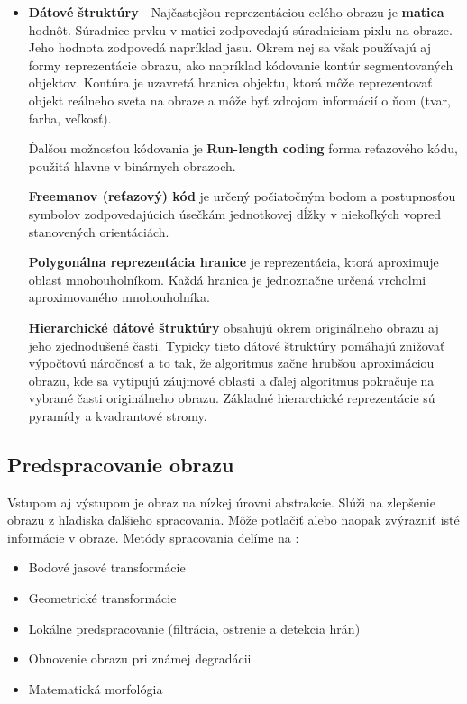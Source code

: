 \begin{itemize}
\item \textbf{Dátové štruktúry} - Najčastejšou reprezentáciou celého obrazu je \textbf{matica} hodnôt. Súradnice prvku v matici zodpovedajú súradniciam pixlu na obraze. Jeho hodnota zodpovedá napríklad jasu.  Okrem nej sa však používajú aj formy reprezentácie obrazu, ako napríklad kódovanie kontúr segmentovaných objektov. Kontúra je uzavretá hranica objektu, ktorá môže reprezentovať objekt reálneho sveta na obraze a môže byť zdrojom informácií o ňom (tvar, farba, veľkosť). \cite{Analysis_and_Machine_Vision}

Ďalšou možnosťou kódovania je \textbf{Run-length coding} forma reťazového kódu, použitá hlavne v binárnych obrazoch. 

\textbf{Freemanov (reťazový) kód} je určený počiatočným bodom a postupnosťou symbolov zodpovedajúcich úsečkám jednotkovej dĺžky v niekoľkých vopred stanovených orientáciách. \cite{Analysis_and_Machine_Vision} 

\textbf{Polygonálna reprezentácia hranice} je reprezentácia, ktorá aproximuje oblasť mnohouholníkom. Každá hranica je jednoznačne určená vrcholmi aproximovaného mnohouholníka. \cite{Analysis_and_Machine_Vision}

\textbf{Hierarchické dátové štruktúry} obsahujú okrem originálneho obrazu aj jeho zjednodušené časti. Typicky tieto dátové štruktúry pomáhajú znižovať výpočtovú náročnosť a to tak, že algoritmus začne hrubšou aproximáciou obrazu, kde sa vytipujú záujmové oblasti a ďalej algoritmus pokračuje na vybrané časti originálneho obrazu. Základné hierarchické reprezentácie sú pyramídy a kvadrantové stromy. \cite{Analysis_and_Machine_Vision} 

\end{itemize}



\subsection{Predspracovanie obrazu}
Vstupom aj výstupom je obraz na nízkej úrovni abstrakcie. Slúži na zlepšenie obrazu z hľadiska ďalšieho spracovania. Môže potlačiť alebo naopak zvýrazniť isté informácie v obraze. Metódy spracovania delíme na \cite{pocitacove_videnie_v_praxi}:
\begin{itemize}
\item Bodové jasové transformácie
\item Geometrické transformácie
\item Lokálne predspracovanie (filtrácia, ostrenie a detekcia hrán)
\item Obnovenie obrazu pri známej degradácii 
\item Matematická morfológia 
\end{itemize}

